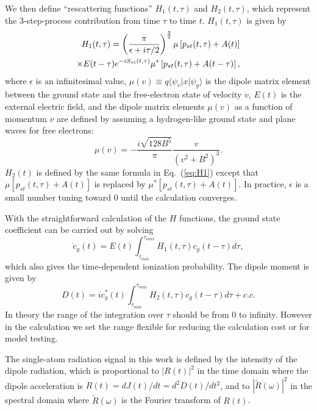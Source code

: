 \documentclass[aps,prl,twocolumn,nofootinbib,letterpaper]{revtex4}
\begin{document}
We then define ``rescattering functions'' $H_1(t,\tau)$ and $H_2(t,\tau)$, which represent the 3-step-process contribution from time $\tau$ to time $t$. $H_1(t,\tau)$ is given by
\begin{eqnarray}
H_1(t,\tau) = \left( \frac{\pi}{\epsilon+i\tau/2} \right)^{\frac{3}{2}} \mu \left[ p_{st}(t,\tau) + A(t) \right]   \notag\\
\times E(t-\tau) e^{-i S_{st}(t,\tau)} \mu^* \left[ p_{st}(t,\tau) + A(t-\tau) \right] , \label{eq:H1}
\end{eqnarray}
where $\epsilon$ is an infinitesimal value, $\mu(v) \equiv q \langle \psi_v |x| \psi_g \rangle$ is the dipole matrix element between the ground state and the free-electron state of velocity $v$, $E(t)$ is the external electric field, and the dipole matrix elements $\mu(v)$ as a function of momentum $v$ are defined by assuming a hydrogen-like ground state and plane waves for free electrons:
\begin{equation}
\mu(v)=-\frac{i \sqrt{128 B^5}}{\pi} \frac{v}{(v^2+B^2)^3}. \label{eq:mu}
\end{equation}
$H_2(t)$ is defined by the same formula in Eq.~(\ref{eq:H1}) except that $\mu \left[ p_{st}(t,\tau) + A(t) \right]$ is replaced by $\mu^* \left[ p_{st}(t,\tau) + A(t) \right]$. In practice, $\epsilon$ is a small number tuning toward 0 until the calculation converges.

With the straightforward calculation of the $H$ functions, the ground state coefficient can be carried out by solving
\begin{equation}
\dot{c}_g(t) = E(t) \int_{\tau_{min}}^{\tau_{max}}{ H_1(t,\tau) c_g(t-\tau) d\tau }, \label{eq:cg}
\end{equation}
which also gives the time-dependent ionization probability. The dipole moment is given by
\begin{equation}
D(t) = i c_g^*(t)  \int_{\tau_{min}}^{\tau_{max}}{ H_2(t,\tau) c_g(t-\tau) d\tau } + c.c. \label{eq:D}
\end{equation}
In theory the range of the integration over $\tau$ should be from 0 to infinity. However in the calculation we set the range flexible for reducing the calculation cost or for model testing.

The single-atom radiation signal in this work is defined by the intensity of the dipole radiation, which is proportional to $|R(t)|^2$ in the time domain where the dipole acceleration is $R(t)=dJ(t)/dt=d^2 D(t)/dt^2$, and to $|\tilde{R}(\omega)|^2$ in the spectral domain where $\tilde{R}(\omega)$ is the Fourier transform of $R(t)$.
\end{document}
